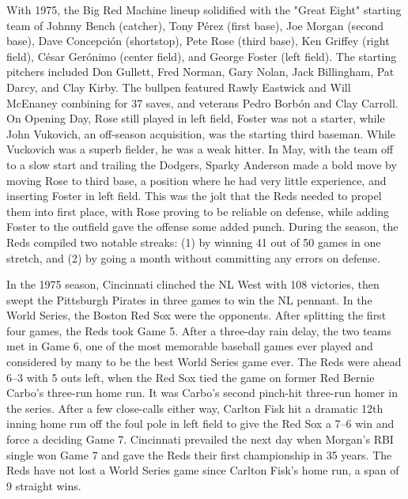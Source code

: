 With 1975, the Big Red Machine lineup solidified with the "Great Eight"
starting team of Johnny Bench (catcher), Tony Pérez (first base), Joe
Morgan (second base), Dave Concepción (shortstop), Pete Rose (third
base), Ken Griffey (right field), César Gerónimo (center field), and
George Foster (left field). The starting pitchers included Don Gullett,
Fred Norman, Gary Nolan, Jack Billingham, Pat Darcy, and Clay Kirby. The
bullpen featured Rawly Eastwick and Will McEnaney combining for 37
saves, and veterans Pedro Borbón and Clay Carroll. On Opening Day, Rose
still played in left field, Foster was not a starter, while John
Vukovich, an off-season acquisition, was the starting third baseman.
While Vuckovich was a superb fielder, he was a weak hitter. In May, with
the team off to a slow start and trailing the Dodgers, Sparky Anderson
made a bold move by moving Rose to third base, a position where he had
very little experience, and inserting Foster in left field. This was the
jolt that the Reds needed to propel them into first place, with Rose
proving to be reliable on defense, while adding Foster to the outfield
gave the offense some added punch. During the season, the Reds compiled
two notable streaks: (1) by winning 41 out of 50 games in one stretch,
and (2) by going a month without committing any errors on defense.

In the 1975 season, Cincinnati clinched the NL West with 108 victories,
then swept the Pittsburgh Pirates in three games to win the NL pennant.
In the World Series, the Boston Red Sox were the opponents. After
splitting the first four games, the Reds took Game 5. After a three-day
rain delay, the two teams met in Game 6, one of the most memorable
baseball games ever played and considered by many to be the best World
Series game ever. The Reds were ahead 6--3 with 5 outs left, when the
Red Sox tied the game on former Red Bernie Carbo's three-run home run.
It was Carbo's second pinch-hit three-run homer in the series. After a
few close-calls either way, Carlton Fisk hit a dramatic 12th inning home
run off the foul pole in left field to give the Red Sox a 7--6 win and
force a deciding Game 7. Cincinnati prevailed the next day when Morgan's
RBI single won Game 7 and gave the Reds their first championship in 35
years. The Reds have not lost a World Series game since Carlton Fisk's
home run, a span of 9 straight wins.

